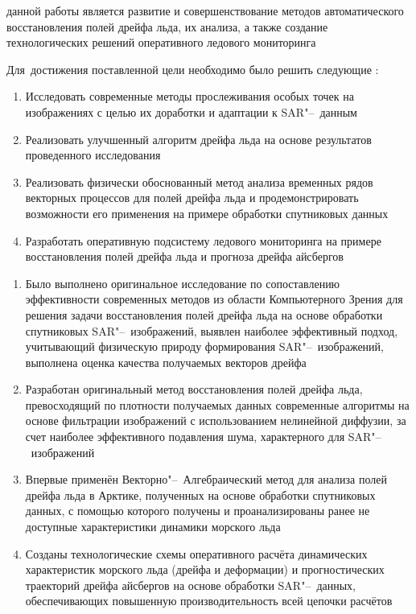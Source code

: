 {\aim} данной работы является развитие и совершенствование методов автоматического восстановления полей дрейфа льда, их анализа, а также создание технологических решений оперативного ледового мониторинга

Для~достижения поставленной цели необходимо было решить следующие {\tasks}:
\begin{enumerate}
  \item Исследовать современные методы прослеживания особых точек на изображениях с целью их доработки и адаптации к SAR"--~данным
  \item Реализовать улучшенный алгоритм дрейфа льда на основе результатов проведенного исследования
  \item Реализовать физически обоснованный метод анализа временных рядов векторных процессов для полей дрейфа льда и продемонстрировать возможности его применения на примере обработки спутниковых данных
  \item Разработать оперативную подсистему ледового мониторинга на примере восстановления полей дрейфа льда и прогноза дрейфа айсбергов
\end{enumerate}


{\novelty}
\begin{enumerate}
  \item Было выполнено оригинальное исследование по сопоставлению эффективности современных методов из области Компьютерного Зрения для решения задачи восстановления полей дрейфа льда на основе обработки спутниковых SAR"--~изображений, выявлен наиболее эффективный подход, учитывающий физическую природу формирования SAR"--~изображений, выполнена оценка качества получаемых векторов дрейфа
  \item Разработан оригинальный метод восстановления полей дрейфа льда, превосходящий по плотности получаемых данных современные алгоритмы на основе фильтрации изображений с использованием нелинейной диффузии, за счет наиболее эффективного подавления шума, характерного для SAR"--~изображений
  \item Впервые применён Векторно"--~Алгебраический метод для анализа полей дрейфа льда в Арктике, полученных на основе обработки спутниковых данных, с помощью которого получены и проанализированы ранее не доступные характеристики динамики морского льда
  \item Созданы технологические схемы оперативного расчёта динамических характеристик морского льда (дрейфа и деформации) и прогностических траекторий дрейфа айсбергов на основе обработки SAR"--~данных, обеспечивающих повышенную производительность всей цепочки расчётов
\end{enumerate}

